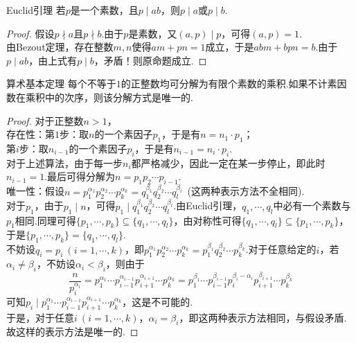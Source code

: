 \begin{theorem}{Euclid引理}
	若$p$是一个素数，且$p \mid ab$，则$p \mid a$或$p \mid b$.
\end{theorem}
\begin{proof}
	假设$p \nmid a$且$p \nmid b$.由于$p$是素数，又$(a,p) \mid p$，可得$(a,p)=1$. \\
	由Bezout定理，存在整数$m,n$使得$am+pn=1$成立，于是$abm+bpn=b$.由于$p \mid ab$，由上式有$p \mid b$，矛盾！则原命题成立.
\end{proof}

\begin{theorem}{算术基本定理}
	每个不等于$1$的正整数均可分解为有限个素数的乘积.如果不计素因数在乘积中的次序，则该分解方式是唯一的.
\end{theorem}
\begin{proof}
	对于正整数$n>1$， \\
	存在性：第$1$步：取$n$的一个素因子$p_1$，于是有$n=n_1 \cdot p_1$； \\
	第$i$步：取$n_{i-1}$的一个素因子$p_i$，于是有$n_{i-1}=n_i \cdot p_i$. \\
	对于上述算法，由于每一步$n_i$都严格减少，因此一定在某一步停止，即此时$n_{i-1}=1$.最后可得分解为$n=p_1p_2 \cdots p_{i-1}$. \\
	唯一性：假设$n = p_1^{\alpha _1} p_2^{\alpha _2} \cdots p_k^{\alpha _k} = q_1^{\beta _1} q_2^{\beta _2} \cdots q_l^{\beta _l}$~(这两种表示方法不全相同). \\
	对于$p_1$，由于$p_1 \mid n$，可得$p_1 \mid q_1^{\beta _1} q_2^{\beta _2} \cdots q_l^{\beta _l}$.由Euclid引理，$q_1, \cdots ,q_l$中必有一个素数与$p_1$相同.同理可得$\{ p_1,\cdots ,p_k \} \subseteq \{ q_1,\cdots ,q_l \}$，由对称性可得$\{ q_1,\cdots ,q_l \} \subseteq \{ p_1,\cdots ,p_k \}$，于是$\{ p_1,\cdots ,p_k \} = \{ q_1,\cdots ,q_l \}$. \\
	不妨设$q_i=p_i~(i=1, \cdots ,k)$，即$p_1^{\alpha _1} p_2^{\alpha _2} \cdots p_k^{\alpha _k} = p_1^{\beta _1} q_2^{\beta _2} \cdots p_k^{\beta _k}$.对于任意给定的$i$，若$\alpha _i \neq \beta _i$，不妨设$\alpha _i < \beta _i$，则由于$$\frac{n}{p_i^{\alpha _i}} = p_1^{\alpha _1} \cdots p_{i-1}^{\alpha _{i-1}} p_{i+1}^{\alpha _{i+1}} \cdots p_{k}^{\alpha _{k}} = p_1^{\beta _1} \cdots p_{i-1}^{\beta _{i-1}} p_{i}^{\beta _{i} - \alpha _{i}} p_{i+1}^{\beta _{i+1}} \cdots p_{k}^{\beta _{k}}$$
	可知$p_i \mid p_1^{\alpha _1} \cdots p_{i-1}^{\alpha _{i-1}} p_{i+1}^{\alpha _{i+1}} \cdots p_{k}^{\alpha _{k}}$，这是不可能的. \\
	于是，对于任意$i~(i=1, \cdots ,k)$，$\alpha _i = \beta _i$，即这两种表示方法相同，与假设矛盾.故这样的表示方法是唯一的.
\end{proof}

